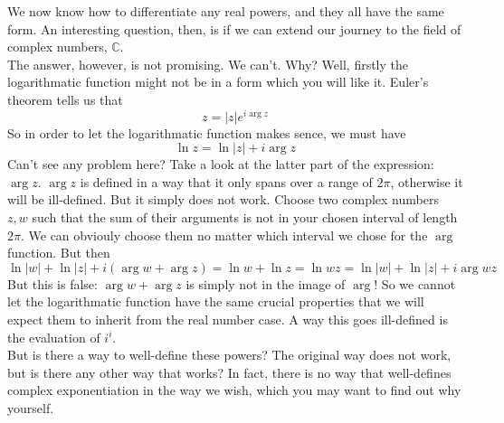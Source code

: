 We now know how to differentiate any real powers, and they all have the same form.
An interesting question, then, is if we can extend our journey to the field of complex numbers, $\mathbb C$.\\
The answer, however, is not promising.
We can't.
Why?
Well, firstly the logarithmatic function might not be in a form which you will like it.
Euler's theorem tells us that
$$z=|z|e^{i\arg{z}}$$
So in order to let the logarithmatic function makes sence, we must have
$$\ln{z}=\ln|z|+i\arg{z}$$
Can't see any problem here?
Take a look at the latter part of the expression: $\arg{z}$.
$\arg{z}$ is defined in a way that it only spans over a range of $2\pi$, otherwise it will be ill-defined.
But it simply does not work. Choose two complex numbers $z,w$ such that the sum of their arguments is not in your chosen interval of length $2\pi$.
We can obviouly choose them no matter which interval we chose for the $\arg$ function.
But then
$$\ln|w|+\ln|z|+i(\arg{w}+\arg{z})=\ln{w}+\ln{z}=\ln{wz}=\ln|w|+\ln|z|+i\arg{wz}$$
But this is false: $\arg{w}+\arg{z}$ is simply not in the image of $\arg$!
So we cannot let the logarithmatic function have the same crucial properties that we will expect them to inherit from the real number case.
A way this goes ill-defined is the evaluation of $i^i$.\\
But is there a way to well-define these powers?
The original way does not work, but is there any other way that works?
In fact, there is no way that well-defines complex exponentiation in the way we wish, which you may want to find out why yourself.
